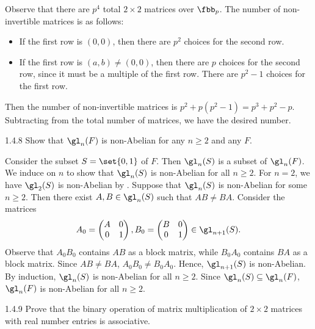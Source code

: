 \begin{sol}
    Observe that there are $p^4$ total $2 \times 2$ matrices over $\fbb_p$.
	The number of non-invertible matrices is as follows:
    \begin{itemize}
        \item If the first row is $(0, 0)$, then there are $p^2$ choices for the second row.
        \item If the first row is $(a, b) \neq (0, 0)$, then there are $p$ choices for the second row, since it must be a multiple of the first row.
	There are $p^2 - 1$ choices for the first row.
    \end{itemize}
    Then the number of non-invertible matrices is $p^2 + p(p^2 - 1) = p^3 + p^2 - p$.
	Subtracting from the total number of matrices, we have the desired number.
\end{sol}

\begin{exercise}{1.4.8}
    Show that $\gl_n(F)$ is non-Abelian for any $n \geq 2$ and any $F$.
\end{exercise}

\begin{sol}
    Consider the subset $S = \set{0, 1}$ of $F$.
	Then $\gl_n(S)$ is a subset of $\gl_n(F)$.
    We induce on $n$ to show that $\gl_n(S)$ is non-Abelian for all $n \geq 2$.
	For $n = 2$, we have $\gl_2(S)$ is non-Abelian by .
	Suppose that $\gl_n(S)$ is non-Abelian for some $n \geq 2$.
	Then there exist $A, B \in \gl_n(S)$ such that $AB \neq BA$.
	Consider the matrices
    \[
    	A_0 = 
        \begin{pmatrix}
            A & 0 \\
            0 & 1
        \end{pmatrix},
        B_0 =
        \begin{pmatrix}
            B & 0 \\
            0 & 1
        \end{pmatrix} \in \gl_{n + 1}(S).
	\]
    Observe that $A_0B_0$ contains $AB$ as a block matrix, while $B_0A_0$ contains $BA$ as a block matrix.
	Since $AB \neq BA$, $A_0B_0 \neq B_0A_0$.
	Hence, $\gl_{n + 1}(S)$ is non-Abelian.
	By induction, $\gl_n(S)$ is non-Abelian for all $n \geq 2$.
	Since $\gl_n(S) \subseteq \gl_n(F)$, $\gl_n(F)$ is non-Abelian for all $n \geq 2$.
\end{sol}

\begin{exercise}{1.4.9}
    Prove that the binary operation of matrix multiplication of $2 \times 2$ matrices with real number entries is associative.
\end{exercise}

